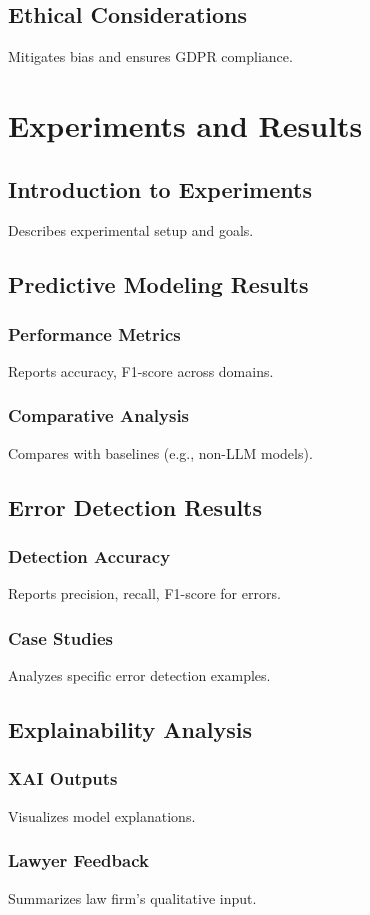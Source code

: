 \documentclass[11pt,a4paper,twoside,openright]{book}
\begin{document}
\section{Ethical Considerations}
Mitigates bias and ensures GDPR compliance.

\chapter{Experiments and Results}
\section{Introduction to Experiments}
Describes experimental setup and goals.
\section{Predictive Modeling Results}
\subsection{Performance Metrics}
Reports accuracy, F1-score across domains.
\subsection{Comparative Analysis}
Compares with baselines (e.g., non-LLM models).
\section{Error Detection Results}
\subsection{Detection Accuracy}
Reports precision, recall, F1-score for errors.
\subsection{Case Studies}
Analyzes specific error detection examples.
\section{Explainability Analysis}
\subsection{XAI Outputs}
Visualizes model explanations.
\subsection{Lawyer Feedback}
Summarizes law firm’s qualitative input.
\end{document}
